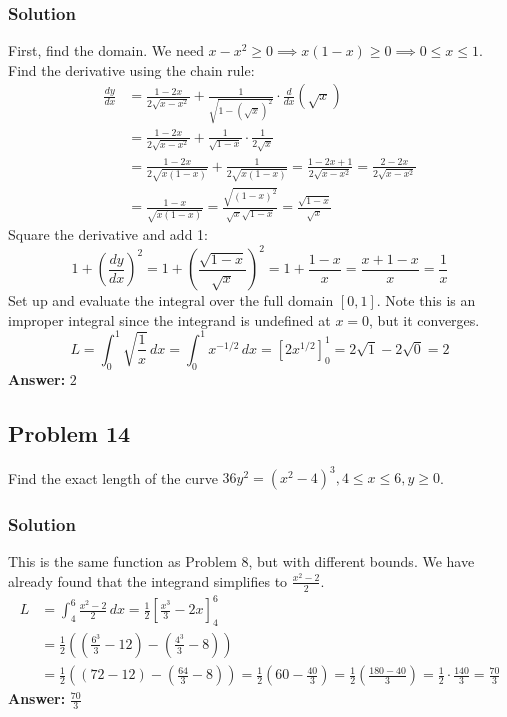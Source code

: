 \documentclass{article}
\begin{document}
\subsubsection*{Solution}
First, find the domain. We need $ x-x^2 \ge 0 \implies x(1-x) \ge 0 \implies 0 \le x \le 1 $.
Find the derivative using the chain rule:
\begin{align*}
    \frac{dy}{dx} &= \frac{1-2x}{2\sqrt{x-x^2}} + \frac{1}{\sqrt{1-(\sqrt{x})^2}} \cdot \frac{d}{dx}(\sqrt{x}) \\
    &= \frac{1-2x}{2\sqrt{x-x^2}} + \frac{1}{\sqrt{1-x}} \cdot \frac{1}{2\sqrt{x}} \\
    &= \frac{1-2x}{2\sqrt{x(1-x)}} + \frac{1}{2\sqrt{x(1-x)}} = \frac{1-2x+1}{2\sqrt{x-x^2}} = \frac{2-2x}{2\sqrt{x-x^2}} \\
    &= \frac{1-x}{\sqrt{x(1-x)}} = \frac{\sqrt{(1-x)^2}}{\sqrt{x}\sqrt{1-x}} = \frac{\sqrt{1-x}}{\sqrt{x}}
\end{align*}
Square the derivative and add 1:
\[ 1 + \left(\frac{dy}{dx}\right)^2 = 1 + \left(\frac{\sqrt{1-x}}{\sqrt{x}}\right)^2 = 1 + \frac{1-x}{x} = \frac{x+1-x}{x} = \frac{1}{x} \]
Set up and evaluate the integral over the full domain $ [0, 1] $. Note this is an improper integral since the integrand is undefined at $x=0$, but it converges.
\[ L = \int_{0}^{1} \sqrt{\frac{1}{x}} \,dx = \int_{0}^{1} x^{-1/2} \,dx = [2x^{1/2}]_{0}^{1} = 2\sqrt{1} - 2\sqrt{0} = 2 \]
\textbf{Answer:} $ 2 $

\subsection{Problem 14}
Find the exact length of the curve $ 36y^2 = (x^2-4)^3, 4 \le x \le 6, y \ge 0 $.
\subsubsection*{Solution}
This is the same function as Problem 8, but with different bounds. We have already found that the integrand simplifies to $ \frac{x^2-2}{2} $.
\begin{align*}
    L &= \int_{4}^{6} \frac{x^2-2}{2} \,dx = \frac{1}{2} \left[ \frac{x^3}{3} - 2x \right]_{4}^{6} \\
    &= \frac{1}{2} \left( \left(\frac{6^3}{3}-12\right) - \left(\frac{4^3}{3}-8\right) \right) \\
    &= \frac{1}{2} \left( (72-12) - (\frac{64}{3}-8) \right) = \frac{1}{2} \left( 60 - \frac{40}{3} \right) = \frac{1}{2}\left( \frac{180-40}{3} \right) = \frac{1}{2} \cdot \frac{140}{3} = \frac{70}{3}
\end{align*}
\textbf{Answer:} $ \frac{70}{3} $
\end{document}
